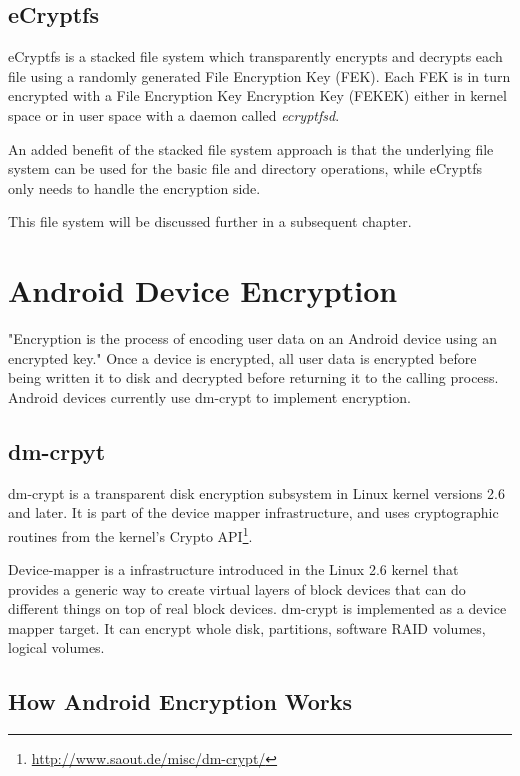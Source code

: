 \subsection{eCryptfs}
\label{sub-sec:sa-ecryptfs}

eCryptfs is a stacked file system which transparently encrypts and decrypts each file using a randomly generated File Encryption Key (FEK). Each FEK is in turn encrypted with a File Encryption Key Encryption Key (FEKEK) either in kernel space or in user space with a daemon called \textit{ecryptfsd}\cite{ecryptfs-keys}.

An added benefit of the stacked file system approach is that the underlying file system can be used for the basic file and directory operations, while eCryptfs only needs to handle the encryption side.

This file system will be discussed further in a subsequent chapter.

\section{Android Device Encryption}
\label{sec:and-dev-enc}

"Encryption is the process of encoding user data on an Android device using an encrypted key\cite{andr-enc}." Once a device is encrypted, all user data is encrypted before being written it to disk and decrypted before returning it to the calling process.
Android devices currently use dm-crypt to implement encryption.

\subsection{dm-crpyt}
\label{sub-sec:dm-crypt}

dm-crypt is a transparent disk encryption subsystem in Linux kernel versions 2.6 and later. It is part of the device mapper infrastructure, and uses cryptographic routines from the kernel's Crypto API\footnote{\url{http://www.saout.de/misc/dm-crypt/}}.

Device-mapper is a infrastructure introduced in the Linux 2.6 kernel that provides a generic way to create virtual layers of block devices that can do different things on top of real block devices.
dm-crypt is implemented as a device mapper target. It can encrypt whole disk, partitions, software RAID volumes, logical volumes.

\subsection{How Android Encryption Works}
\label{sub-sec:and-enc-works}


